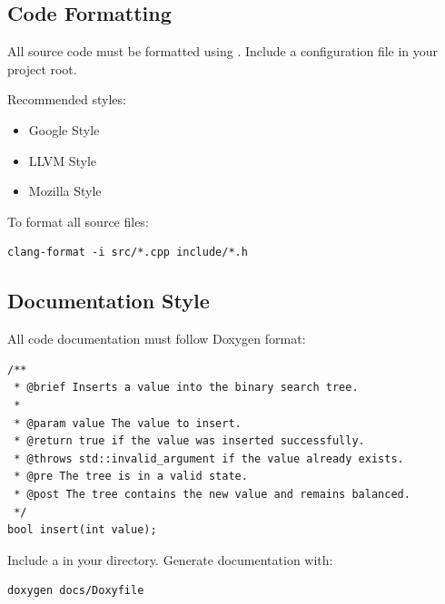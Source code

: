 \subsection{Code Formatting}

All source code must be formatted using . Include a  configuration file in your project root.

Recommended styles:
\begin{itemize}
  \item Google \cpp{} Style
  \item LLVM Style
  \item Mozilla Style
\end{itemize}

To format all source files:

\begin{lstlisting}[style=bash]
clang-format -i src/*.cpp include/*.h
\end{lstlisting}

\subsection{Documentation Style}

All code documentation must follow Doxygen format:

\begin{lstlisting}[style=cpp]
/**
 * @brief Inserts a value into the binary search tree.
 *
 * @param value The value to insert.
 * @return true if the value was inserted successfully.
 * @throws std::invalid_argument if the value already exists.
 * @pre The tree is in a valid state.
 * @post The tree contains the new value and remains balanced.
 */
bool insert(int value);
\end{lstlisting}

Include a  in your  directory. Generate documentation with:

\begin{lstlisting}[style=bash]
doxygen docs/Doxyfile
\end{lstlisting}
